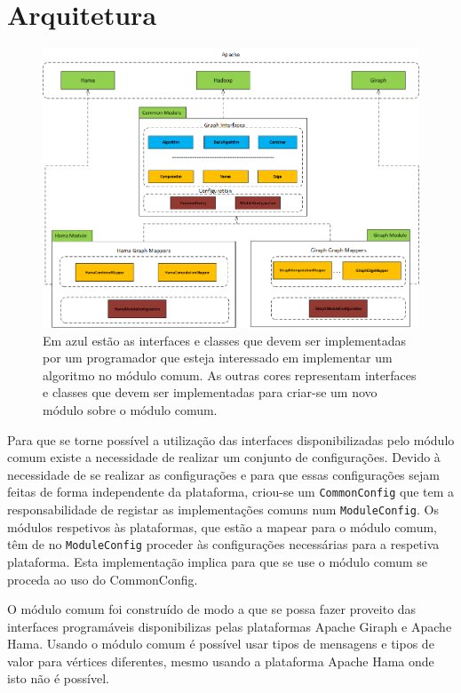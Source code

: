 \chapter{Arquitetura}
\begin{figure}[H]
	\centering
		\includegraphics[width=\linewidth]{arquitetura}
	\caption{Em azul estão as interfaces e classes que devem ser 
	implementadas por um programador que esteja interessado em implementar 
um algoritmo no módulo comum. As outras cores representam interfaces e classes 
que devem ser implementadas para criar-se um novo módulo sobre o módulo comum.}
	\label{fig:arquitetura}
\end{figure}

Para que se torne possível a utilização das interfaces disponibilizadas pelo 
módulo comum existe a necessidade de realizar um conjunto de configurações. 
Devido à necessidade de se realizar as configurações e para que essas 
configurações sejam feitas de forma independente da plataforma, 
criou-se um \texttt{CommonConfig} que tem a responsabilidade de registar as 
implementações comuns num \texttt{ModuleConfig}. Os módulos respetivos às 
plataformas, que estão a mapear para o módulo comum, têm de no 
\texttt{ModuleConfig} proceder às configurações necessárias para a respetiva 
plataforma. Esta implementação implica para que se use o módulo comum se proceda 
ao uso do CommonConfig.

O módulo comum foi construído de modo a que se possa fazer proveito das 
interfaces programáveis disponibilizas pelas plataformas Apache Giraph e Apache 
Hama. Usando o módulo comum é possível usar tipos de mensagens e tipos de valor 
para vértices diferentes, mesmo usando a plataforma Apache Hama onde isto não é 
possível.

